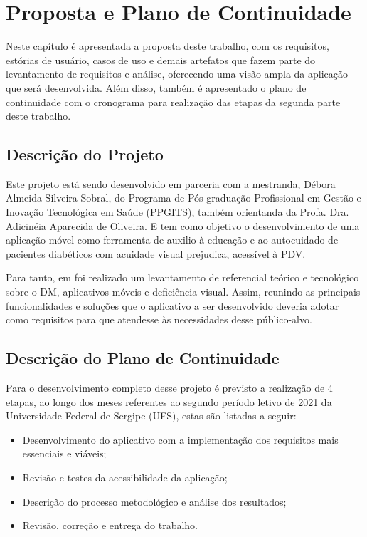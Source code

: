 \chapter{Proposta e Plano de Continuidade}
\label{ch:propos}

Neste capítulo é apresentada a proposta deste trabalho, com os requisitos, estórias de usuário, casos de uso e demais artefatos
que fazem parte do levantamento de requisitos e análise, oferecendo uma visão ampla da aplicação que será desenvolvida.
Além disso, também é apresentado o plano de continuidade com o cronograma para realização das etapas da segunda parte deste
trabalho.

\section{Descrição do Projeto}

Este projeto está sendo desenvolvido em parceria com a mestranda, Débora Almeida Silveira Sobral, do
Programa de Pós-graduação Profissional em Gestão e Inovação Tecnológica em Saúde (PPGITS), também orientanda da Profa.
Dra. Adicinéia Aparecida de Oliveira. E tem como objetivo
o desenvolvimento de uma aplicação móvel como ferramenta de auxilio à educação e ao autocuidado de pacientes diabéticos
com acuidade visual prejudica, acessível à PDV\@.

Para tanto, em  foi realizado um levantamento de referencial teórico e tecnológico sobre o DM,
aplicativos móveis e deficiência visual. Assim, reunindo as principais funcionalidades e soluções que o aplicativo a ser
desenvolvido deveria adotar como requisitos para que atendesse às necessidades desse público-alvo.

\section{Descrição do Plano de Continuidade}

Para o desenvolvimento completo desse projeto é previsto a realização de 4 etapas, ao longo dos meses referentes ao segundo
período letivo de 2021 da Universidade Federal de Sergipe (UFS), estas são listadas a seguir:
\begin{itemize}
    \item Desenvolvimento do aplicativo com a implementação dos requisitos mais essenciais e viáveis;
    \item Revisão e testes da acessibilidade da aplicação;
    \item Descrição do processo metodológico e análise dos resultados;
    \item Revisão, correção e entrega do trabalho.
\end{itemize}

